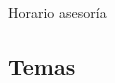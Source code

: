 \documentclass[10pt,xcolor={dvipsnames}]{beamer}
\begin{document}
\begin{frame}{Horario asesoría}
\end{frame}

\subsection{Temas}
\end{document}
